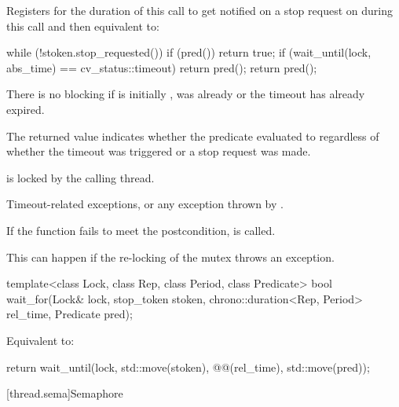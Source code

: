 \begin{itemdescr}
\pnum
\effects
Registers for the duration of this call 
to get notified on a stop request on 
during this call and then equivalent to:
\begin{codeblock}
while (!stoken.stop_requested()) {
  if (pred())
    return true;
  if (wait_until(lock, abs_time) == cv_status::timeout)
    return pred();
}
return pred();
\end{codeblock}

\pnum
\begin{note}
There is no blocking if  is initially ,
 was already 
or the timeout has already expired.
\end{note}

\pnum
\begin{note}
The returned value indicates whether the predicate evaluated to 
regardless of whether the timeout was triggered or a stop request was made.
\end{note}

\pnum
\ensures
{} is locked by the calling thread.

\pnum
\throws
Timeout-related exceptions,
or any exception thrown by .

\pnum
\remarks
If the function fails to meet the postcondition,
 is called.
\begin{note}
This can happen if the re-locking of the mutex throws an exception.
\end{note}
\end{itemdescr}

\begin{itemdecl}
template<class Lock, class Rep, class Period, class Predicate>
  bool wait_for(Lock& lock, stop_token stoken,
                chrono::duration<Rep, Period> rel_time, Predicate pred);
\end{itemdecl}

\begin{itemdescr}
\pnum
\effects
Equivalent to:
\begin{codeblock}
return wait_until(lock, std::move(stoken), @@(rel_time),
                  std::move(pred));
\end{codeblock}
\end{itemdescr}

[thread.sema]{Semaphore}

